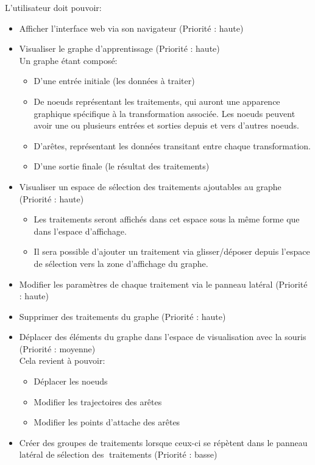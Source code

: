 \documentclass{article}
\begin{document}
L'utilisateur doit pouvoir:
\begin{itemize}
    \item Afficher l'interface web via son navigateur (Priorité : haute)
    \item Visualiser le graphe d'apprentissage (Priorité : haute) \\
          Un graphe étant composé:
        \begin{itemize}
            \item D'une entrée initiale (les données à traiter)
            \item De noeuds représentant les traitements, qui auront une apparence graphique spécifique à la transformation associée. Les noeuds peuvent avoir une ou plusieurs entrées et sorties depuis et vers d'autres noeuds.
            \item D'arêtes, représentant les données transitant entre chaque transformation.
            \item D'une sortie finale (le résultat des traitements)
        \end{itemize}
    \item Visualiser un espace de sélection des traitements ajoutables au graphe (Priorité : haute)
        \begin{itemize}
            \item Les traitements seront affichés dans cet espace sous la même forme que dans l'espace d'affichage.
            \item Il sera possible d'ajouter un traitement via glisser/déposer depuis l'espace de sélection vers la zone d'affichage du graphe.
        \end{itemize}
    \item Modifier les paramètres de chaque traitement via le panneau latéral (Priorité : haute)
    \item Supprimer des traitements du graphe (Priorité : haute)
    \item Déplacer des éléments du graphe dans l'espace de visualisation avec la souris (Priorité : moyenne) \\
            Cela revient à pouvoir: 
        \begin{itemize}
            \item Déplacer les noeuds 
            \item Modifier les trajectoires des arêtes
            \item Modifier les points d'attache des arêtes
        \end{itemize}
    \item Créer des groupes de traitements lorsque ceux-ci se répètent dans le panneau latéral de sélection des traitements (Priorité : basse)

\end{itemize}
\end{document}
